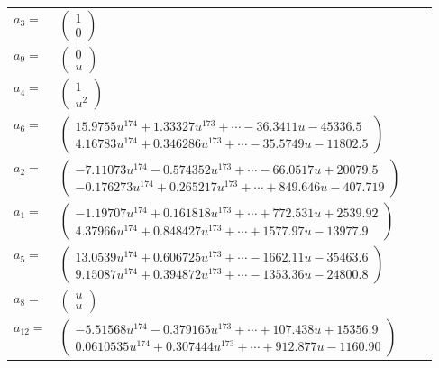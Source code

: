 \documentclass[1p]{elsarticle_modified}
\theoremstyle{definition}
\begin{document}
\begin{tabular}{m{7pt} m{180pt} m{7pt} m{180pt} }
\flushright $a_{3}=$&$\begin{pmatrix}1\\0\end{pmatrix}$ \\
\flushright $a_{9}=$&$\begin{pmatrix}0\\u\end{pmatrix}$ \\
\flushright $a_{4}=$&$\begin{pmatrix}1\\u^2\end{pmatrix}$ \\
\flushright $a_{6}=$&$\begin{pmatrix}15.9755 u^{174}+1.33327 u^{173}+\cdots-36.3411 u-45336.5\\4.16783 u^{174}+0.346286 u^{173}+\cdots-35.5749 u-11802.5\end{pmatrix}$ \\
\flushright $a_{2}=$&$\begin{pmatrix}-7.11073 u^{174}-0.574352 u^{173}+\cdots-66.0517 u+20079.5\\-0.176273 u^{174}+0.265217 u^{173}+\cdots+849.646 u-407.719\end{pmatrix}$ \\
\flushright $a_{1}=$&$\begin{pmatrix}-1.19707 u^{174}+0.161818 u^{173}+\cdots+772.531 u+2539.92\\4.37966 u^{174}+0.848427 u^{173}+\cdots+1577.97 u-13977.9\end{pmatrix}$ \\
\flushright $a_{5}=$&$\begin{pmatrix}13.0539 u^{174}+0.606725 u^{173}+\cdots-1662.11 u-35463.6\\9.15087 u^{174}+0.394872 u^{173}+\cdots-1353.36 u-24800.8\end{pmatrix}$ \\
\flushright $a_{8}=$&$\begin{pmatrix}u\\u\end{pmatrix}$ \\
\flushright $a_{12}=$&$\begin{pmatrix}-5.51568 u^{174}-0.379165 u^{173}+\cdots+107.438 u+15356.9\\0.0610535 u^{174}+0.307444 u^{173}+\cdots+912.877 u-1160.90\end{pmatrix}$ \\

\end{tabular}
\end{document}

